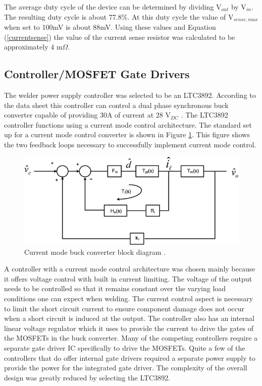 \documentclass[11pt]{article}
\begin{document}
    \noindent The average duty cycle of the device can be determined by dividing V$_{out}$ by V$_{in}$. The resulting duty cycle is about 77.8$\%$. At this duty cycle the value of V$_{sense,max}$ when set to 100mV is about 88mV. Using these values and Equation (\ref{currentsense}) the value of the current sense resistor was calculated to be approximately 4 m$\Omega$.
    
    \subsection{Controller/MOSFET Gate Drivers}
    
    \noindent The welder power supply controller was selected to be an LTC3892. According to the data sheet this controller can control a dual phase synchronous buck converter capable of providing 30A of current at 28 V$_{DC}$ \cite{linear_technology_ltc3892:_nodate}. The LTC3892 controller functions using a current mode control architecture. The standard set up for a current mode control converter is shown in Figure \ref{currentmode}. This figure shows the two feedback loops necessary to successfully implement current mode control.
    
    \begin{figure}[H]
        \centering
        \includegraphics[width=0.5\linewidth]{Block-diagram-of-control-to-output-for-boost-converter-with-peak-current-mode-control.png}
        \caption{Current mode buck converter block diagram \cite{shen_yaur_chen_block_2016}.}
        \label{currentmode}
    \end{figure}
    
    \noindent A controller with a current mode control architecture was chosen mainly because it offers voltage control with built in current limiting. The voltage of the output needs to be controlled so that it remains constant over the varying load conditions one can expect when welding. The current control aspect is necessary to limit the short circuit current to ensure component damage does not occur when a short circuit is induced at the output.
    \newline
    \newline
    \noindent The controller also has an internal linear voltage regulator which it uses to provide the current to drive the gates of the MOSFETs in the buck converter. Many of the competing controllers require a separate gate driver IC specifically to drive the MOSFETs. Quite a few of the controllers that do offer internal gate drivers required a separate power supply to provide the power for the integrated gate driver. The complexity of the overall design was greatly reduced by selecting the LTC3892.
    
\end{document}
